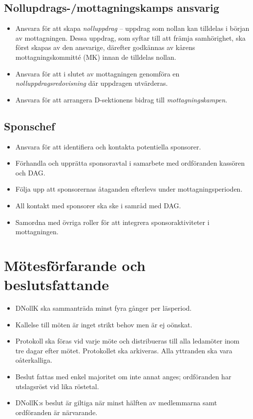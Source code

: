 \documentclass[a4paper]{dtekinstruktion}
\begin{document}
\subsection{Nollupdrags-/mottagningskamps ansvarig}
\begin{itemize}
  \item Ansvara för att skapa \emph{nolluppdrag} – uppdrag som nollan kan tilldelas i början av mottagningen. Dessa uppdrag, som syftar till att främja samhörighet, ska först skapas av den ansvarige, därefter godkännas av kårens mottagningskommitté (MK) innan de tilldelas nollan.
  \item Ansvara för att i slutet av mottagningen genomföra en \emph{nolluppdragsredovisning} där uppdragen utvärderas.
  \item Ansvara för att arrangera D-sektionens bidrag till \emph{mottagningskampen}.
\end{itemize}

\subsection{Sponschef}
\begin{itemize}
  \item Ansvara för att identifiera och kontakta potentiella sponsorer.
  \item Förhandla och upprätta sponsoravtal i samarbete med ordföranden kassören och DAG.
  \item Följa upp att sponsorernas åtaganden efterlevs under mottagningsperioden.
  \item All kontakt med sponsorer ska ske i samråd med DAG.
  \item Samordna med övriga roller för att integrera sponsoraktiviteter i mottagningen.
\end{itemize}

\section{Mötesförfarande och beslutsfattande}
\begin{itemize}
  \item DNollK ska sammanträda minst fyra gånger per läsperiod.
  \item Kallelse till möten är inget strikt behov men är ej oönskat.
  \item Protokoll ska föras vid varje möte och distribueras till alla ledamöter inom tre dagar efter mötet. Protokollet ska arkiveras. Alla yttranden ska vara oåterkalliga.
  \item Beslut fattas med enkel majoritet om inte annat anges; ordföranden har utslagsröst vid lika röstetal.
  \item DNollK:s beslut är giltiga när minst hälften av medlemmarna samt ordföranden är närvarande.
\end{itemize}
\end{document}
